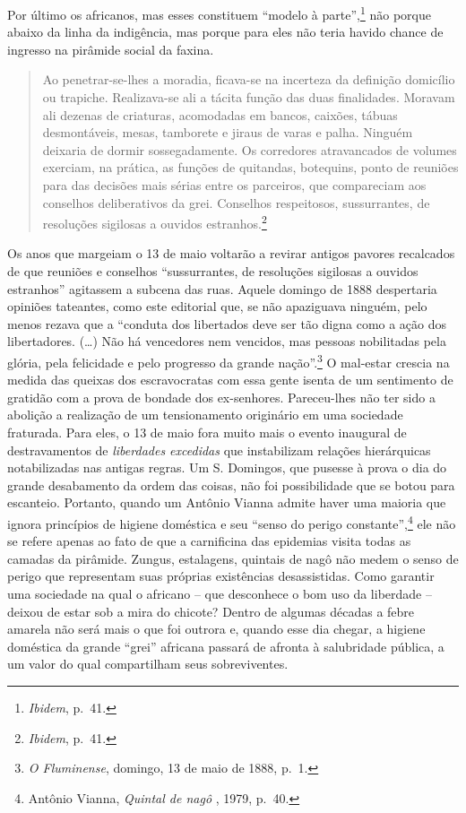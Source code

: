 Por último os africanos, mas esses constituem ``modelo à
parte'',\footnote{\emph{Ibidem}, p.~41.} não porque abaixo da linha da
indigência, mas porque para eles não teria havido chance de ingresso na
pirâmide social da faxina.

\begin{quote}
Ao penetrar-se-lhes a moradia, ficava-se na incerteza da definição
domicílio ou trapiche. Realizava-se ali a tácita função das duas
finalidades. Moravam ali dezenas de criaturas, acomodadas em bancos,
caixões, tábuas desmontáveis, mesas, tamborete e jiraus de varas e
palha. Ninguém deixaria de dormir sossegadamente. Os corredores
atravancados de volumes exerciam, na prática, as funções de quitandas,
botequins, ponto de reuniões para das decisões mais sérias entre os
parceiros, que compareciam aos conselhos deliberativos da grei.
Conselhos respeitosos, sussurrantes, de resoluções sigilosas a ouvidos
estranhos.\footnote{\emph{Ibidem}, p.~41.}
\end{quote}

Os anos que margeiam o 13 de maio voltarão a revirar antigos pavores
recalcados de que reuniões e conselhos ``sussurrantes, de resoluções
sigilosas a ouvidos estranhos'' agitassem a subcena das ruas. Aquele
domingo de 1888 despertaria opiniões tateantes, como este editorial que,
se não apaziguava ninguém, pelo menos rezava que a ``conduta dos
libertados deve ser tão digna como a ação dos libertadores. (\ldots{})
Não há vencedores nem vencidos, mas pessoas nobilitadas pela glória,
pela felicidade e pelo progresso da grande nação''.\footnote{\emph{O
  Fluminense}, domingo, 13 de maio de 1888, p.~1.} O mal-estar crescia
na medida das queixas dos escravocratas com essa gente isenta de um
sentimento de gratidão com a prova de bondade dos ex-senhores.
Pareceu-lhes não ter sido a abolição a realização de um tensionamento
originário em uma sociedade fraturada. Para eles, o 13 de maio fora
muito mais o evento inaugural de destravamentos de \emph{liberdades
excedidas} que instabilizam relações hierárquicas notabilizadas nas
antigas regras. Um S. Domingos, que pusesse à prova o dia do grande
desabamento da ordem das coisas, não foi possibilidade que se botou para
escanteio. Portanto, quando um Antônio Vianna admite haver uma maioria
que ignora princípios de higiene doméstica e seu ``senso do perigo
constante'',\footnote{Antônio Vianna, \emph{Quintal de nagô} , 1979,
  p.~40.} ele não se refere apenas ao fato de que a carnificina das
epidemias visita todas as camadas da pirâmide. Zungus, estalagens,
quintais de nagô não medem o senso de perigo que representam suas
próprias existências desassistidas. Como garantir uma sociedade na qual
o africano -- que desconhece o bom uso da liberdade -- deixou de estar
sob a mira do chicote? Dentro de algumas décadas a febre amarela não
será mais o que foi outrora e, quando esse dia chegar, a higiene
doméstica da grande ``grei'' africana passará de afronta à salubridade
pública, a um valor do qual compartilham seus sobreviventes.

